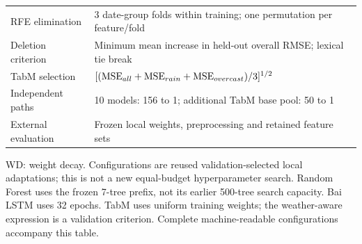 \begin{table}[!htbp]
\begin{tabular}{lp{12cm}}
RFE elimination & 3 date-group folds within training; one permutation per feature/fold \\
Deletion criterion & Minimum mean increase in held-out overall RMSE; lexical tie break \\
TabM selection & $[({\rm MSE}_{all}+{\rm MSE}_{rain}+{\rm MSE}_{overcast})/3]^{1/2}$ \\
Independent paths & 10 models: 156 to 1; additional TabM base pool: 50 to 1 \\
External evaluation & Frozen local weights, preprocessing and retained feature sets \\
\bottomrule
\end{tabular}
\par\smallskip
\begin{minipage}{\textwidth}\footnotesize WD: weight decay. Configurations are reused validation-selected local adaptations; this is not a new equal-budget hyperparameter search. Random Forest uses the frozen 7-tree prefix, not its earlier 500-tree search capacity. Bai LSTM uses 32 epochs. TabM uses uniform training weights; the weather-aware expression is a validation criterion. Complete machine-readable configurations accompany this table.\end{minipage}
\end{table}
\endgroup
